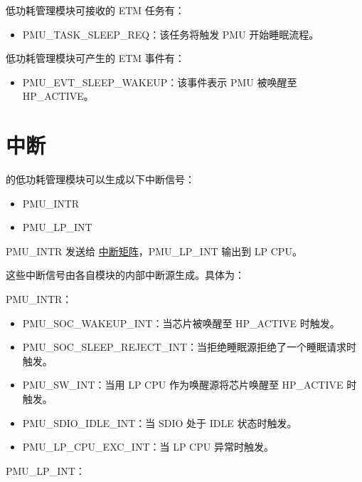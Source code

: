 \documentclass[main\_\_CN.tex]{subfiles}
\begin{document}
低功耗管理模块可接收的 ETM 任务有：

\begin{itemize}
\item PMU\_TASK\_SLEEP\_REQ：该任务将触发 PMU 开始睡眠流程。
\end{itemize}

低功耗管理模块可产生的 ETM 事件有：

\begin{itemize}
\item PMU\_EVT\_SLEEP\_WAKEUP：该事件表示 PMU 被唤醒至 HP\_ACTIVE。
\end{itemize}



\section{中断}

\chipname{} 的低功耗管理模块可以生成以下中断信号：

\begin{itemize}
    \item PMU\_INTR
    \item PMU\_LP\_INT
\end{itemize}

PMU\_INTR 发送给 \hyperref[mod:intmtrx]{中断矩阵}，PMU\_LP\_INT 输出到 LP CPU。

这些中断信号由各自模块的内部中断源生成。具体为：

PMU\_INTR：

\begin{itemize}
\item \label{int:PMUSOCWAKEUPINT}PMU\_SOC\_WAKEUP\_INT：当芯片被唤醒至 HP\_ACTIVE 时触发。

\item \label{int:PMUSOCSLEEPREJECTINT}PMU\_SOC\_SLEEP\_REJECT\_INT：当拒绝睡眠源拒绝了一个睡眠请求时触发。

\item \label{int:PMUSWINT}PMU\_SW\_INT：当用 LP CPU 作为唤醒源将芯片唤醒至 HP\_ACTIVE 时触发。
\item \label{int:PMUSDIOIDLEINT}PMU\_SDIO\_IDLE\_INT：当 SDIO 处于 IDLE 状态时触发。
\item \label{int:PMULPCPUEXCINT}PMU\_LP\_CPU\_EXC\_INT：当 LP CPU 异常时触发。
\end{itemize}

PMU\_LP\_INT：
\end{document}
